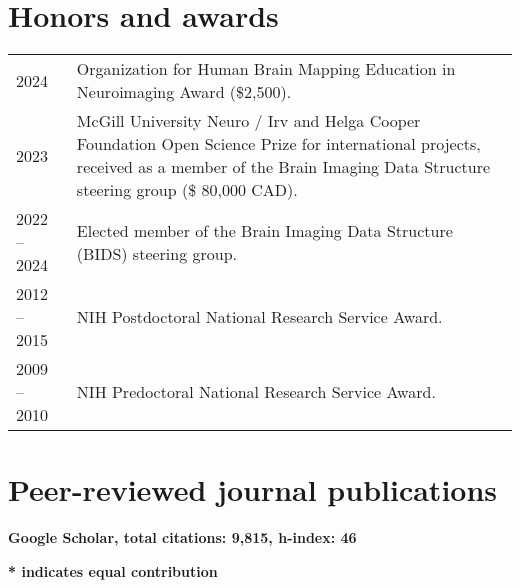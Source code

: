 \documentclass[11pt,fullpage]{article}
\begin{document}
\section*{Honors and awards}
\begin{tabular}{p{}p{}}

2024 & Organization for Human Brain Mapping Education in Neuroimaging Award (\$2,500).\\
2023 &  McGill University Neuro / Irv and Helga Cooper Foundation Open Science Prize for international projects, received as a member of the Brain Imaging Data Structure steering group (\$ 80,000 CAD).\\
2022 -- 2024 & Elected member of the Brain Imaging Data Structure (BIDS) steering group. \\
2012 -- 2015 & NIH Postdoctoral National Research Service Award. \\
2009 -- 2010 & NIH Predoctoral National Research Service Award. \\
\end{tabular}

\section*{Peer-reviewed journal publications}
\textbf{Google Scholar, total citations: 9,815, h-index: 46}

\textbf{* indicates equal contribution}
\end{document}
